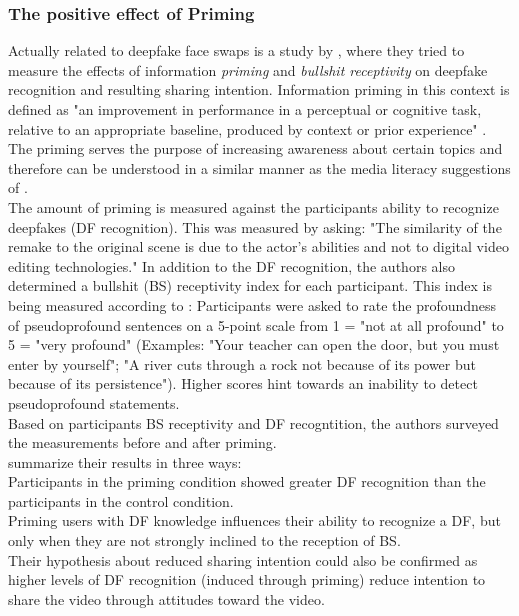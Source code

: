 \documentclass[
  a4paper,  %
  twoside,  %
  bibliography=totoc,
  headsepline,
  cleardoublepage=empty,
  parskip=half,
  draft=false
]{scrbook}
\begin{document}
\subsubsection*{The positive effect of Priming}
Actually related to deepfake face swaps is a study by \citeauthor{iacobucciDeepfakesUnmaskedEffects2021}, where they tried to measure the effects of information \textit{priming} and \textit{bullshit receptivity} on deepfake recognition and resulting sharing intention. Information priming in this context is defined as "an improvement in performance in a perceptual or cognitive task, relative to an appropriate baseline, produced by context or prior experience" \cite{iacobucciDeepfakesUnmaskedEffects2021}. The priming serves the purpose of increasing awareness about certain topics and therefore can be understood in a similar manner as the media literacy suggestions of \citeauthor{hwangEffectsDisinformationUsing2021}. \\
The amount of priming is measured against the participants ability to recognize deepfakes (DF recognition). This was measured by asking: "The similarity of the remake to the original scene is due to the actor's abilities and not to digital video editing technologies." In addition to the DF recognition, the authors also determined a bullshit (BS) receptivity index for each participant. This index is being measured according to \cite{pennycookReceptionDetectionPseudoprofound2015}: Participants were asked to rate the profoundness of pseudoprofound sentences on a 5-point scale from 1 = "not at all profound" to 5 = "very profound" (Examples: "Your teacher can open the door, but you must enter by yourself"; "A river cuts through a rock not because of its power but because of its persistence"). Higher scores hint towards an inability to detect pseudoprofound statements. \\
Based on participants BS receptivity and DF recogntition, the authors surveyed the measurements before and after priming. \\
\citeauthor{iacobucciDeepfakesUnmaskedEffects2021} summarize their results in three ways: \\
Participants in the priming condition showed greater DF recognition than the participants in the control condition. \\
Priming users with DF knowledge influences their ability to recognize a DF, but only when they are not strongly inclined to the reception of BS. \\
Their hypothesis about reduced sharing intention could also be confirmed as higher levels of DF recognition (induced through priming) reduce intention to share the video through attitudes toward the video. \\
\end{document}

